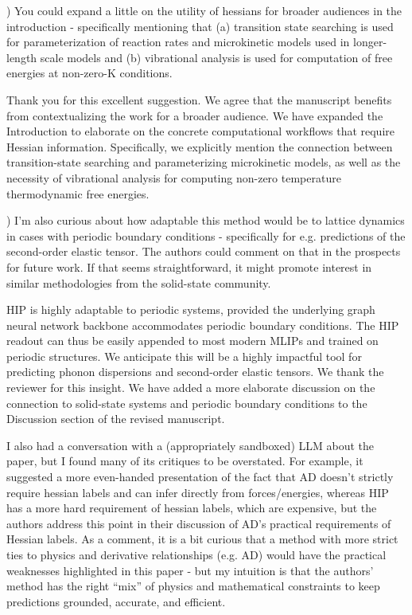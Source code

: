 \documentclass[11pt,letterpaper]{article}
\begin{document}
) You could expand a little on the utility of hessians for broader audiences in the introduction - specifically mentioning that (a) transition state searching is used for parameterization of reaction rates and microkinetic models used in longer-length scale models and (b) vibrational analysis is used for computation of free energies at non-zero-K conditions.

{\color{responsecolour}
\noindent Thank you for this excellent suggestion. We agree that the manuscript benefits from contextualizing the work for a broader audience. We have expanded the Introduction to elaborate on the concrete computational workflows that require Hessian information. Specifically, we explicitly mention the connection between transition-state searching and parameterizing microkinetic models, as well as the necessity of vibrational analysis for computing non-zero temperature thermodynamic free energies.
}
\vspace{1mm}

) I’m also curious about how adaptable this method would be to lattice dynamics in cases with periodic boundary conditions - specifically for e.g. predictions of the second-order elastic tensor. The authors could comment on that in the prospects for future work. If that seems straightforward, it might promote interest in similar methodologies from the solid-state community.

{\color{responsecolour}
\noindent HIP is highly adaptable to periodic systems, provided the underlying graph neural network backbone accommodates periodic boundary conditions. The HIP readout can thus be easily appended to most modern MLIPs and trained on periodic structures. We anticipate this will be a highly impactful tool for predicting phonon dispersions and second-order elastic tensors. We thank the reviewer for this insight. We have added a more elaborate discussion on the connection to solid-state systems and periodic boundary conditions to the Discussion section of the revised manuscript.

}
\vspace{1mm}

\noindent I also had a conversation with a (appropriately sandboxed) LLM about the paper, but I found many of its critiques to be overstated. For example, it suggested a more even-handed presentation of the fact that AD doesn’t strictly require hessian labels and can infer directly from forces/energies, whereas HIP has a more hard requirement of hessian labels, which are expensive, but the authors address this point in their discussion of AD’s practical requirements of Hessian labels. As a comment, it is a bit curious that a method with more strict ties to physics and derivative relationships (e.g. AD) would have the practical weaknesses highlighted in this paper - but my intuition is that the authors’ method has the right “mix” of physics and mathematical constraints to keep predictions grounded, accurate, and efficient.
\end{document}
